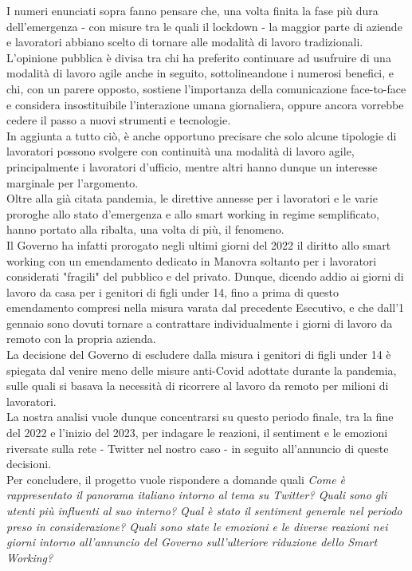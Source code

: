 \documentclass[12pt,journal,compsoc]{IEEEtran}
\begin{document}
I numeri enunciati sopra fanno pensare che, una volta finita la fase più dura dell'emergenza - con misure tra le quali il lockdown - la maggior parte di aziende e lavoratori abbiano scelto di tornare alle modalità di lavoro tradizionali.\\
L'opinione pubblica è divisa tra chi ha preferito continuare ad usufruire di una modalità di lavoro agile anche in seguito, sottolineandone i numerosi benefici, e chi, con un parere opposto, sostiene l'importanza della comunicazione face-to-face e considera insostituibile l'interazione umana giornaliera, oppure ancora vorrebbe cedere il passo a nuovi strumenti e tecnologie.\\
In aggiunta a tutto ciò, è anche opportuno precisare che solo alcune tipologie di lavoratori possono svolgere con continuità una modalità di lavoro agile, principalmente i lavoratori d'ufficio, mentre altri hanno dunque un interesse marginale per l'argomento.\\
Oltre alla già citata pandemia, le direttive annesse per i lavoratori e le varie proroghe allo stato d'emergenza e allo smart working in regime semplificato, hanno portato alla ribalta, una volta di più, il fenomeno.\\
Il Governo ha infatti prorogato negli ultimi giorni del 2022 il diritto allo smart working con un emendamento dedicato in Manovra soltanto per i lavoratori considerati "fragili" del pubblico e del privato. Dunque, dicendo addio ai giorni di lavoro da casa per i genitori di figli under 14, fino a prima di questo emendamento compresi nella misura varata dal precedente Esecutivo, e che dall’1 gennaio sono dovuti tornare a contrattare individualmente i giorni di lavoro da remoto con la propria azienda.\\
La decisione del Governo di escludere dalla misura i genitori di figli under 14 è spiegata dal venire meno delle misure anti-Covid adottate durante la pandemia, sulle quali si basava la necessità di ricorrere al lavoro da remoto per milioni di lavoratori.\\
La nostra analisi vuole dunque concentrarsi su questo periodo finale, tra la fine del 2022 e l'inizio del 2023, per indagare le reazioni, il sentiment e le emozioni riversate sulla rete - Twitter nel nostro caso - in seguito all'annuncio di queste decisioni.\\
Per concludere, il progetto vuole rispondere a domande quali \textit{Come è rappresentato il panorama italiano intorno al tema su Twitter? Quali sono gli utenti più influenti al suo interno? Qual è stato il sentiment generale nel periodo preso in considerazione? Quali sono state le emozioni e le diverse reazioni nei giorni intorno all'annuncio del Governo sull'ulteriore riduzione dello Smart Working?}
\end{document}

